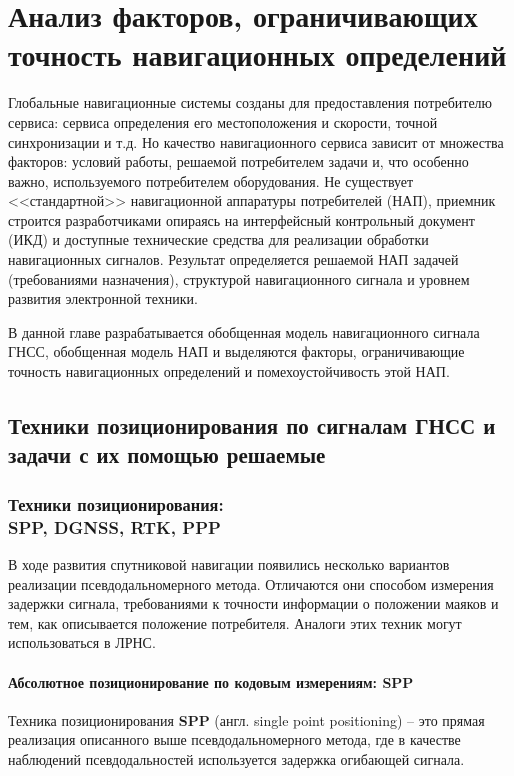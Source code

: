 \chapter{Анализ факторов, ограничивающих точность навигационных определений}
\label{cha:analysis}

Глобальные навигационные системы созданы для предоставления потребителю сервиса: сервиса определения его местоположения и скорости, точной синхронизации и т.д. 
Но качество навигационного сервиса зависит от множества факторов: условий работы, решаемой потребителем задачи и, что особенно важно, используемого потребителем оборудования. 
Не существует <<стандартной>> навигационной аппаратуры потребителей (НАП), приемник строится разработчиками опираясь на интерфейсный контрольный документ (ИКД) и доступные технические средства для реализации обработки навигационных сигналов. 
Результат определяется решаемой НАП задачей (требованиями назначения), структурой навигационного сигнала и уровнем развития электронной техники. 

В данной главе разрабатывается обобщенная модель навигационного сигнала ГНСС, обобщенная модель НАП и выделяются факторы, ограничивающие точность навигационных определений и помехоустойчивость этой НАП.


\section{Техники позиционирования по сигналам ГНСС и задачи с их помощью решаемые}


\subsection{Техники позиционирования: \\SPP, DGNSS, RTK, PPP}

В ходе развития спутниковой навигации появились несколько вариантов реализации псевдодальномерного метода. 
Отличаются они способом измерения задержки сигнала, требованиями к точности информации о положении маяков и тем, как описывается положение потребителя. 
Аналоги этих техник могут использоваться в ЛРНС.

\subsubsection{Абсолютное позиционирование по кодовым измерениям: SPP}

Техника позиционирования \textbf{SPP} (англ. single point positioning) -- это прямая реализация описанного выше псевдодальномерного метода, где в качестве наблюдений псевдодальностей используется задержка огибающей сигнала.

